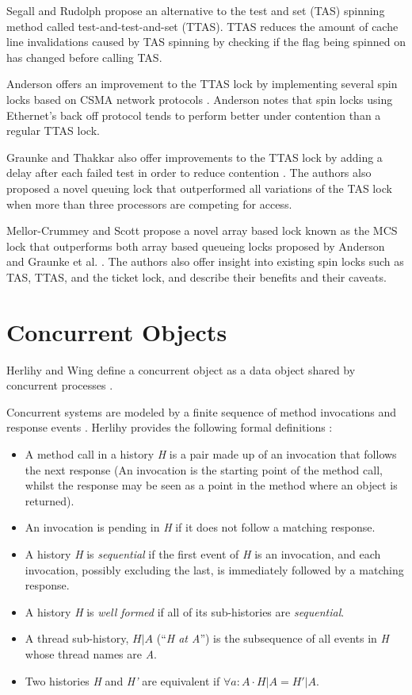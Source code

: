 Segall and Rudolph \cite{rudolph1984dynamic} propose an alternative to the test and set (TAS) spinning method called test-and-test-and-set (TTAS). TTAS reduces the amount of cache line invalidations caused by TAS spinning by checking if the flag being spinned on has changed before calling TAS.

Anderson offers an improvement to the TTAS lock by implementing several spin locks based on CSMA network protocols \cite{anderson1990performance}. Anderson notes that spin locks using Ethernet's back off protocol tends to perform better under contention than a regular TTAS lock.

Graunke and Thakkar also offer improvements to the TTAS lock by adding a delay after each failed test in order to reduce contention \cite{graunke1990synchronization}. The authors also proposed a novel queuing lock that outperformed all variations of the TAS lock when more than three processors are competing for access.

Mellor-Crummey and Scott propose a novel array based lock known as the MCS lock that outperforms both array based queueing locks proposed by Anderson and Graunke et al. \cite{mellor1991algorithms}. The authors also offer insight into existing spin locks such as TAS, TTAS, and the ticket lock, and describe their benefits and their caveats.
\section{Concurrent Objects}
Herlihy and Wing define a concurrent object as a data object shared by concurrent processes \cite{herlihy1990linearizability}. 

Concurrent systems are modeled by a finite sequence of method invocations and response events \cite[Chapter~3.6]{herlihy2020art}. Herlihy provides the following formal definitions \cite[Chapter~3.6]{herlihy2020art}:
\begin{itemize}
  \item A method call in a history \emph{H} is a pair made up of an invocation that follows the next response (An invocation is the starting point of the method call, whilst the response may be seen as a point in the method where an object is returned).
  \item An invocation is pending in \emph{H} if it does not follow a matching response.
  \item A history \emph{H} is \emph{sequential} if the first event of \emph{H} is an invocation, and each invocation, possibly excluding the last, is immediately followed by a matching response.
  \item A history \emph{H} is \emph{well formed} if all of its sub-histories are \emph{sequential}.
  \item A thread sub-history, $H|A$  (``\emph{H at A}'') is the subsequence of all events in \emph{H} whose thread names are \emph{A}.
  \item Two histories \emph{H} and \emph{H'} are equivalent if $\forall a:A \cdot H|A = H'|A$.
\end{itemize}

